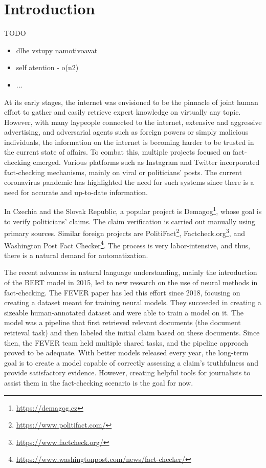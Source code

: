 \chapter*{Introduction}

TODO

\begin{itemize}
    \item dlhe vstupy namotivoavat
    \item self atention - o(n2)
    \item ...
\end{itemize}

At its early stages, the internet was envisioned to be the pinnacle of joint human effort to gather and easily retrieve expert knowledge on virtually any topic.
However, with many laypeople connected to the internet, extensive and aggressive advertising, and adversarial agents such as foreign powers or simply malicious individuals, the information on the internet is becoming harder to be trusted in the current state of affairs.
To combat this, multiple projects focused on fact-checking emerged. 
Various platforms such as Instagram and Twitter incorporated fact-checking mechanisms, mainly on viral or politicians' posts.
The current coronavirus pandemic has highlighted the need for such systems since there is a need for accurate and up-to-date information. 

In Czechia and the Slovak Republic, a popular project is Demagog\footnote{\url{https://demagog.cz}}, whose goal is to verify politicians' claims.
The claim verification is carried out manually using primary sources. 
Similar foreign projects are PolitiFact\footnote{\url{https://www.politifact.com/}}, Factcheck.org\footnote{\url{https://www.factcheck.org/}}, and Washington Post Fact Checker\footnote{\url{https://www.washingtonpost.com/news/fact-checker/}}.
The process is very labor-intensive, and thus, there is a natural demand for automatization.

The recent advances in natural language understanding, mainly the introduction of the BERT model \citep{bert} in 2015, led to new research on the use of neural methods in fact-checking.
The FEVER paper \citep{fever} has led this effort since 2018, focusing on creating a dataset meant for training neural models.
They succeeded in creating a sizeable human-annotated dataset and were able to train a model on it.
The model was a pipeline that first retrieved relevant documents (the document retrieval task) and then labeled the initial claim based on these documents. 
Since then, the FEVER team held multiple shared tasks, and the pipeline approach proved to be adequate.
With better models released every year, the long-term goal is to create a model capable of correctly assessing a claim's truthfulness and provide satisfactory evidence. However, creating helpful tools for journalists to assist them in the fact-checking scenario is the goal for now.

